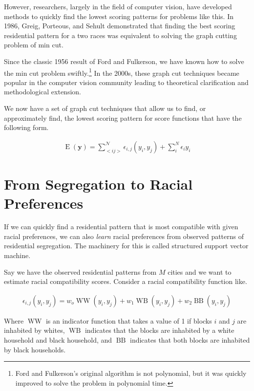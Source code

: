 However, researchers, largely in the field of computer vision, have
developed methods to quickly find the lowest scoring patterns for
problems like this. In 1986, Greig, Porteous, and Sehult demonstrated
that finding the best scoring residential pattern for a two races 
was equivalent to solving the graph cutting problem of min
cut.\cite{greig_exact_1989}

 Since the classic 1956 result of Ford and Fulkerson, we have known
 how to solve the min cut problem swiftly.\footnote{Ford and Fulkerson's
   original algorithm is not polynomial, but it was quickly improved
   to solve the problem in polynomial time.\cite{ford_maximal_1956}}
 In the 2000s, these graph cut techniques became popular in the
 computer vision community leading to theoretical
 clarification and methodological extension.\cite{kolmogorov_what_2004}

We now have a set of graph cut techniques that allow us to find, or
approximately find, the lowest scoring pattern for score functions
that have the following form.

\begin{align}
\operatorname{E}(\mathbf{y}) = \sum_{<i
  j>}^{\mathcal{N}}\epsilon_{i,j}(y_i,y_j) + \sum_i^N\epsilon_i{y_i}
\end{align}

\section*{From Segregation to Racial Preferences}
If we can quickly find a residential pattern that is most compatible
with given racial preferences, we can also \emph{learn} racial
preferences from observed patterns of residential segregation. The
machinery for this is called structured support vector machine. 

Say we have the observed residential patterns from $M$ cities and we
want to estimate racial compatibility scores. Consider a racial
compatibility function like.

\begin{align}
  \epsilon_{i,j}(y_i,y_j) = w_o\operatorname{WW}(y_{i}, y_{j}) +
  w_1\operatorname{WB}(y_{i}, y_{j}) + w_2\operatorname{BB}(y_{i}, y_{j})
\end{align} 

Where $\operatorname{WW}$ is an indicator function that takes a value
of 1 if blocks $i$ and $j$ are inhabited by whites,
$\operatorname{WB}$ indicates that the blocks are inhabited by a white
household and black household, and $\operatorname{BB}$ indicates that
both blocks are inhabited by black households.

